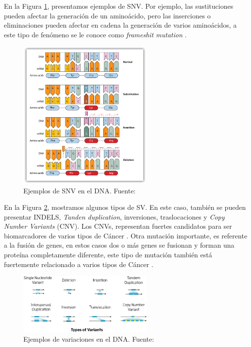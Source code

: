 En la Figura \ref{fig:SNV}, presentamos ejemplos de SNV. Por ejemplo, las sustituciones pueden afectar la generación de un aminoácido, pero las inserciones o eliminaciones pueden afectar en cadena la generación de varios aminoácidos, a este tipo de fenómeno se le conoce como \textit{frameshit mutation} \citep{xu2018review}.


\begin{figure}[h]
	\centering
	\includegraphics[width=0.6\textwidth]{img/neoantigen/SNV}
	\caption{Ejemplos de SNV en el DNA. Fuente: \cite{socrates2022}}
	\label{fig:SNV}
\end{figure}

En la Figura \ref{fig:variants}, mostramos algunos tipos de SV. En este caso, también se pueden presentar INDELS, \textit{Tanden duplication}, inversiones, traslocaciones y \textit{Copy Number Variants} (CNV). Los CNVs, representan fuertes candidatos para ser biomarcadores de varios tipos de Cáncer \citep{pan2019identification, lucito2007copy}. Otra mutación importante, es referente a la fusión de genes, en estos casos dos o más genes se fusionan y forman una proteína completamente diferente, este tipo de mutación también está fuertemente relacionado a varios tipos de Cáncer \citep{kerbs2022fusion, kim2019fusiongdb, heyer2020sequencing}.

\begin{figure}[h]
	\centering
	\includegraphics[width=0.6\textwidth]{img/neoantigen/variants}
	\caption{Ejemplos de variaciones en el DNA. Fuente: \cite{sv_pacbio_2021}}
	\label{fig:variants}
\end{figure}

